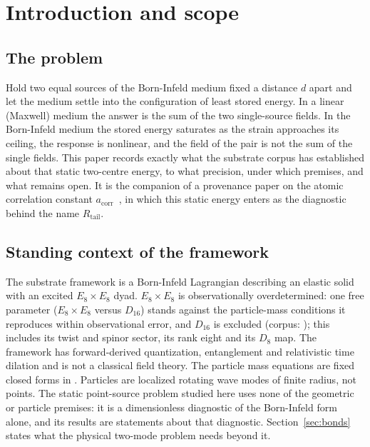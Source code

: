\documentclass[aps,prd,onecolumn,amsmath,amssymb,longbibliography,floatfix,nofootinbib]{revtex4-2}
\begin{document}
\maketitle

\section{Introduction and scope}

\subsection{The problem}
Hold two equal sources of the Born-Infeld medium fixed a distance $d$ apart and let the medium settle into the configuration of least stored energy. In a linear (Maxwell) medium the answer is the sum of the two single-source fields. In the Born-Infeld medium the stored energy saturates as the strain approaches its ceiling, the response is nonlinear, and the field of the pair is not the sum of the single fields. This paper records exactly what the substrate corpus has established about that static two-centre energy, to what precision, under which premises, and what remains open. It is the companion of a provenance paper on the atomic correlation constant $a_{\mathrm{corr}}$~\cite{AcorrPaper}, in which this static energy enters as the diagnostic behind the name $R_{\mathrm{tail}}$.

\subsection{Standing context of the framework}
The substrate framework is a Born-Infeld Lagrangian describing an elastic solid with an excited $E_8\times E_8$ dyad. $E_8\times E_8$ is observationally overdetermined: one free parameter ($E_8\times E_8$ versus $D_{16}$) stands against the particle-mass conditions it reproduces within observational error, and $D_{16}$ is excluded (corpus: ); this includes its twist and spinor sector, its rank eight and its $D_8$ map. The framework has forward-derived quantization, entanglement and relativistic time dilation and is not a classical field theory. The particle mass equations are fixed closed forms in . Particles are localized rotating wave modes of finite radius, not points. The static point-source problem studied here uses none of the geometric or particle premises: it is a dimensionless diagnostic of the Born-Infeld form alone, and its results are statements about that diagnostic. Section~\ref{sec:bonds} states what the physical two-mode problem needs beyond it.
\end{document}
